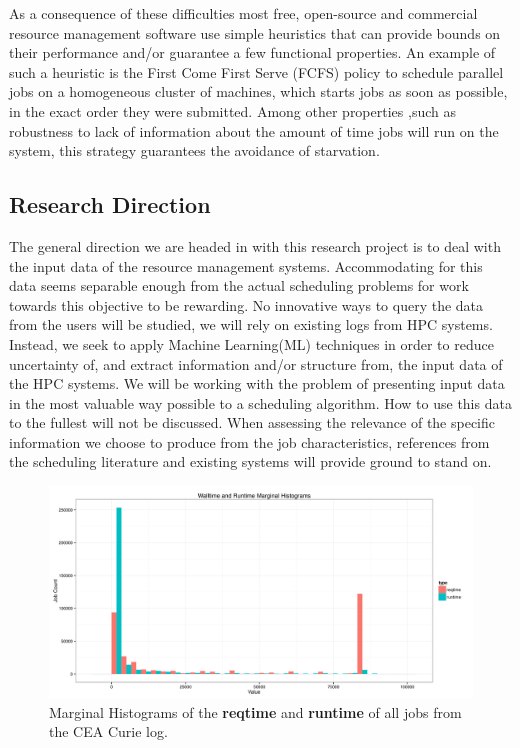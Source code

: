 \documentclass{article}
\begin{document}
As a consequence of these difficulties most free, open-source and commercial resource management software use simple heuristics that can provide bounds on their performance and/or guarantee a few functional properties.
An example of such a heuristic is the First Come First Serve (FCFS) policy to schedule parallel jobs on a homogeneous cluster of machines, which starts jobs as soon as possible, in the exact order they were submitted.
Among other properties ,such as robustness to lack of information about the amount of time jobs will run on the system, this strategy guarantees the avoidance of starvation.

\subsection{Research Direction}
The general direction we are headed in with this research project is to deal with the input data of the resource management systems.
Accommodating for this data seems separable enough from the actual scheduling problems for work towards this objective to be rewarding.
No innovative ways to query the data from the users will be studied, we will rely on existing logs from HPC systems. Instead, we seek to apply Machine Learning(ML) techniques in order to reduce uncertainty of, and extract information and/or structure from, the input data of the HPC systems.
We will be working with the problem of presenting input data in the most valuable way possible to a scheduling algorithm. How to use this data to the fullest will not be discussed.
When assessing the relevance of the specific information we choose to produce from the job characteristics, references from the scheduling literature and existing systems will provide ground to stand on.


\begin{figure}[b]
  \centering
  \includegraphics[width=\textwidth]{../../wallimage-0.png}
  \caption{Marginal Histograms of the \textbf{reqtime} and \textbf{runtime} of all jobs from the CEA Curie log.}
  \label{fig:_wall_run_for_report_pdf}
\end{figure}
\end{document}
